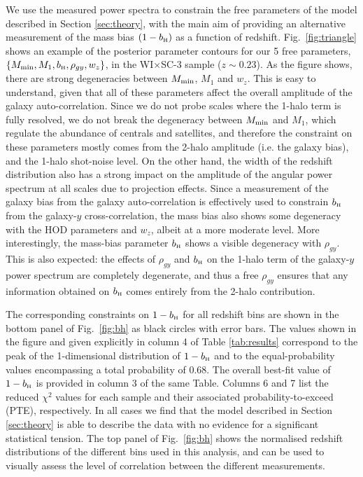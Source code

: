 \documentclass[useAMS,usenatbib]{mn2e}
\newcommand{\wisc}{WI$\times$SC}
\def\bH{b_{\scriptscriptstyle\rm H}}
\begin{document}
      We use the measured power spectra to constrain the free parameters of the model described in Section \ref{sec:theory}, with the main aim of providing an alternative measurement of the mass bias $(1-\bH)$ as a function of redshift. Fig.\!~\ref{fig:triangle} shows an example of the posterior parameter contours for our 5 free parameters, $\{M_{\rm min},M_1,\bH,\rho_{gy},w_z\}$, in the \wisc-3 sample ($z\sim0.23$). As the figure shows, there are strong degeneracies between $M_{\rm min}$, $M_1$ and $w_z$. This is easy to understand, given that all of these parameters affect the overall amplitude of the galaxy auto-correlation. Since we do not probe scales where the 1-halo term is fully resolved, we do not break the degeneracy between $M_{\rm min}$ and $M_1$, which regulate the abundance of centrals and satellites, and therefore the constraint on these parameters mostly comes from the 2-halo amplitude (i.e. the galaxy bias), and the 1-halo shot-noise level. On the other hand, the width of the redshift distribution also has a strong impact on the amplitude of the angular power spectrum at all scales due to projection effects. Since a measurement of the galaxy bias from the galaxy auto-correlation is effectively used to constrain $\bH$ from the galaxy-$y$ cross-correlation, the mass bias also shows some degeneracy with the HOD parameters and $w_z$, albeit at a more moderate level. More interestingly, the mass-bias parameter $\bH$ shows a visible degeneracy with $\rho_{gy}$. This is also expected: the effects of $\rho_{gy}$ and $\bH$ on the 1-halo term of the galaxy-$y$ power spectrum are completely degenerate, and thus a free $\rho_{gy}$ ensures that any information obtained on $\bH$ comes entirely from the 2-halo contribution.
      
      The corresponding constraints on $1-\bH$ for all redshift bins are shown in the bottom panel of Fig.\!~\ref{fig:bh} as black circles with error bars. The values shown in the figure and given explicitly in column 4 of Table \ref{tab:results} correspond to the peak of the 1-dimensional distribution of $1-\bH$ and to the equal-probability values encompassing a total probability of 0.68. The overall best-fit value of $1-\bH$ is provided in column 3 of the same Table. Columns 6 and 7 list the reduced $\chi^2$ values for each sample and their associated probability-to-exceed (PTE), respectively. In all cases we find that the model described in Section \ref{sec:theory} is able to describe the data with no evidence for a significant statistical tension. The top panel of Fig.\!~\ref{fig:bh} shows the normalised redshift distributions of the different bins used in this analysis, and can be used to visually assess the level of correlation between the different measurements.
      
\end{document}
